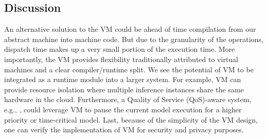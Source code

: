 \vspace{-1.5em}
\subsection{Discussion}


An alternative solution to the VM could be ahead of time compilation from our abstract machine into machine code.
But due to the granularity of the operations, dispatch time makes up a very small portion of the execution time. More importantly, the VM provides flexibility traditionally attributed to virtual machines and a clear compiler/runtime split.
We see the potential of VM to be integrated as a runtime module into a larger system.
For example, VM can provide resource isolation where multiple inference instances share the same hardware in the cloud. Furthermore, a Quality of Service (QoS)-aware system, e.g., \citep{kang2018hotmobile, Yachir2009rsj}, could leverage VM to pause the current model execution for a higher priority or time-critical model. Last, because of the simplicity of the VM design, one can verify the implementation of VM for security and privacy purposes.

